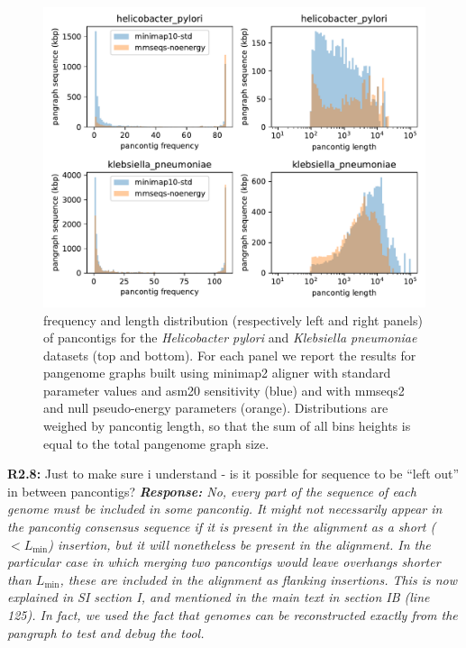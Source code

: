 \documentclass[aps,rmp,onecolumn]{revtex4-1}
\newcommand{\Lthr}{L_{\min}}
\newcommand{\reviewer}[2]{\textbf{#1:} #2\vskip 5mm}
\newcommand{\response}[1]{{\it {\color{response}\textbf{Response:} #1}}\vskip 5mm}
\newcommand{\SIgraph}{I}
\begin{document}
\begin{figure}[tb]
      \includegraphics[width=.7\textwidth]{figs_response/hp_vs_kp.pdf}
      \caption{frequency and length distribution (respectively left and right panels) of pancontigs for the \textit{Helicobacter pylori} and \textit{Klebsiella pneumoniae} datasets (top and bottom). For each panel we report the results for pangenome graphs built using minimap2 aligner with standard parameter values and asm20 sensitivity (blue) and with mmseqs2 and null pseudo-energy parameters (orange). Distributions are weighed by pancontig length, so that the sum of all bins heights is equal to the total pangenome graph size.}
      \label{fig:kp-vs-hp}
\end{figure}

\reviewer{R2.8}{Just to make sure i understand - is it possible for sequence to be ``left out'' in between pancontigs?}
\response{No, every part of the sequence of each genome must be included in some pancontig. 
It might not necessarily appear in the pancontig consensus sequence if it is present in the alignment as a short ($< \Lthr$) insertion, but it will nonetheless be present in the alignment. 
In the particular case in which merging two pancontigs would leave overhangs shorter than $\Lthr$, these are included in the alignment as flanking insertions. 
This is now explained in SI section {\SIgraph}, and mentioned in the main text in section IB (line 125).
In fact, we used the fact that genomes can be reconstructed exactly from the pangraph to test and debug the tool. }
\end{document}
